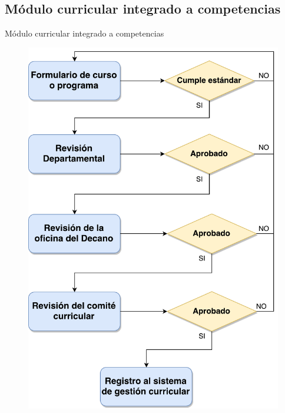 \documentclass[10pt,xcolor=table ]{beamer}
\begin{document}
\subsection{Módulo curricular integrado a competencias}
\begin{frame}{Módulo curricular integrado a competencias}
	\begin{figure}
		\centering
	    \includegraphics[scale=0.25,left]{../Figuras/problematica/course_creation_flow}
	\end{figure}
\end{frame}
\end{document}

